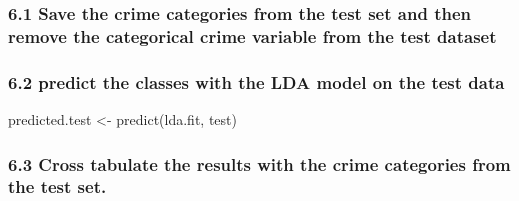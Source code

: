 \documentclass[
]{article}
\newenvironment{Shaded}{\begin{snugshade}}{\end{snugshade}}
\newcommand{\AttributeTok}[1]{\textcolor[rgb]{0.77,0.63,0.00}{#1}}
\newcommand{\CommentTok}[1]{\textcolor[rgb]{0.56,0.35,0.01}{\textit{#1}}}
\newcommand{\ConstantTok}[1]{\textcolor[rgb]{0.00,0.00,0.00}{#1}}
\newcommand{\FunctionTok}[1]{\textcolor[rgb]{0.00,0.00,0.00}{#1}}
\newcommand{\NormalTok}[1]{#1}
\newcommand{\OtherTok}[1]{\textcolor[rgb]{0.56,0.35,0.01}{#1}}
\newcommand{\SpecialCharTok}[1]{\textcolor[rgb]{0.00,0.00,0.00}{#1}}
\begin{document}
\hypertarget{save-the-crime-categories-from-the-test-set-and-then-remove-the-categorical-crime-variable-from-the-test-dataset}{%
\subsubsection{6.1 Save the crime categories from the test set and then
remove the categorical crime variable from the test
dataset}\label{save-the-crime-categories-from-the-test-set-and-then-remove-the-categorical-crime-variable-from-the-test-dataset}}

\begin{Shaded}
\end{Shaded}

\hypertarget{predict-the-classes-with-the-lda-model-on-the-test-data}{%
\subsubsection{6.2 predict the classes with the LDA model on the test
data}\label{predict-the-classes-with-the-lda-model-on-the-test-data}}

\begin{Shaded}
\begin{Highlighting}[]
\NormalTok{predicted.test }\OtherTok{\textless{}{-}} \FunctionTok{predict}\NormalTok{(lda.fit, test)}
\end{Highlighting}
\end{Shaded}

\hypertarget{cross-tabulate-the-results-with-the-crime-categories-from-the-test-set.}{%
\subsubsection{6.3 Cross tabulate the results with the crime categories
from the test
set.}\label{cross-tabulate-the-results-with-the-crime-categories-from-the-test-set.}}

\begin{Shaded}
\end{Shaded}
\end{document}
